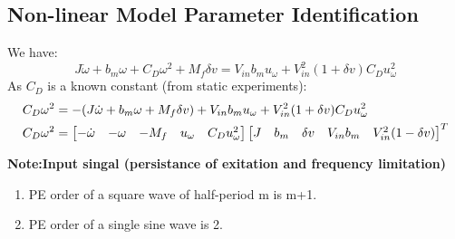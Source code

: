 \subsection{Non-linear Model Parameter Identification}
We have:
$$J \dot \omega + b_m \omega + C_D \omega^2 + M_f \delta v = V_{in} b_m u_\omega + V_{in}^2 (1 + \delta v) C_D u_\omega^2$$
As $C_D$ is a known constant (from static experiments):
\begin{align*}
    C_D \omega^2 &= -(J \dot \omega + b_m \omega + M_f \delta v) + V_{in} b_m u_\omega + V_{in}^2 (1 + \delta v) C_D u_\omega^2\\
    C_D \omega^2 &= \begin{bmatrix} -\dot \omega & -\omega & -M_f & u_\omega & C_D u_\omega ^2 \end{bmatrix} \begin{bmatrix} J & b_m & \delta v & V_{in} b_m & V_{in}^2 (1 - \delta v) \end{bmatrix}^T\\
\end{align*}


\textbf{Note:Input singal (persistance of exitation and frequency limitation)}
\begin{enumerate}
   \item PE order of a square wave of half-period m is m+1.
   \item PE order of a single sine wave is 2.
\end{enumerate}
